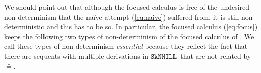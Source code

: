 \documentclass[copyright,creativecommons]{eptcs}
\theoremstyle{definition}
\newcommand{\tr}{\otimes \mathsf{R}}
\newcommand{\lright}{{\multimap}\mathsf{R}}
\newcommand{\lleft}{{\multimap}\mathsf{L}}
\newcommand{\pass}{\mathsf{pass}}
\newcommand{\ax}{\mathsf{ax}}
\newcommand{\ot}{\otimes}
\newcommand{\lolli}{\multimap}
\newcommand{\RI}{\mathsf{RI}}
\newcommand{\LI}{\mathsf{LI}}
\newcommand{\Pass}{\mathsf{P}}
\newcommand{\F}{\mathsf{F}}
\newcommand{\SkNMILL}{$\mathtt{SkNMILL}$}
\begin{document}

We should point out that although the focused calculus is free of the undesired non-determinism that the na\"ive attempt (\ref{eq:naive}) suffered from, it is still non-deterministic and this has to be so. In particular, the focused calculus (\ref{eq:focus}) keeps the following two types of non-determinism of the focused calculus of \cite{uustalu:sequent:2021}.
We call these types of non-determinism \emph{essential} because they reflect the fact that there are sequents with multiple derivations in \SkNMILL\ that are not related by $\circeq$.
\end{document}
